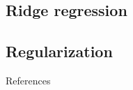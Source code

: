 \documentclass{beamer}
\numberwithin{equation}{section}
\begin{document}
\subsection{Ridge regression}

\subsection{Regularization}

\begin{frame}{References}
    
    
\end{frame}
\end{document}
